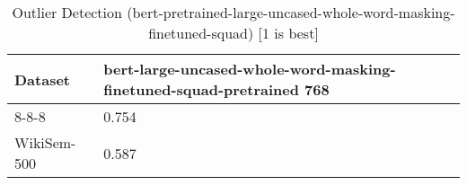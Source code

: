 \begin{table}[]
\centering
\begin{tabular}{l|l}
\hline
Dataset & bert-large-uncased-whole-word-masking-finetuned-squad-pretrained 768 \\
\hline
8-8-8 & 0.754 \\ 
WikiSem-500 & 0.587
\end{tabular}
\caption{Outlier Detection (bert-pretrained-large-uncased-whole-word-masking-finetuned-squad) [1 is best]}
\label{tab:outlier-bert-pretrained-large-uncased-whole-word-masking-finetuned-squad}
\end{table}
